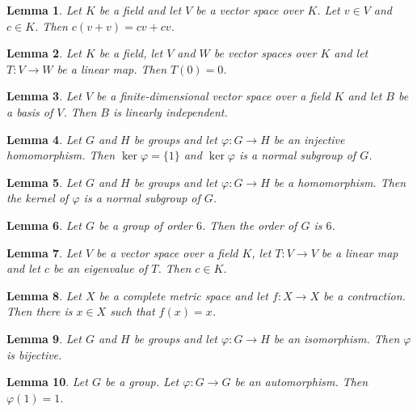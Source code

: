 \documentclass{article}
\newtheorem{lemma}{Lemma}
\begin{document}
\begin{lemma}\label{scalar}
Let $K$ be a field and let $V$ be a vector space over $K$. Let $v\in V$ and $c\in K$. Then $c(v+v)=cv+cv$.
\end{lemma}

\begin{lemma}\label{linear}
Let $K$ be a field, let $V$ and $W$ be vector spaces over $K$ and let $T\colon V\to W$ be a linear map. Then $T(0)=0$.
\end{lemma}

\begin{lemma}\label{basis}
Let $V$ be a finite-dimensional vector space over a field $K$ and let $B$ be a basis of $V$. Then $B$ is linearly independent.
\end{lemma}

\begin{lemma}\label{kernel}
Let $G$ and $H$ be groups and let $\varphi\colon G\to H$ be an injective homomorphism. Then $\ker\varphi=\{1\}$ and $\ker\varphi$ is a normal subgroup of $G$.
\end{lemma}

\begin{lemma}\label{kernel-normal}
Let $G$ and $H$ be groups and let $\varphi\colon G\to H$ be a homomorphism. Then the kernel of $\varphi$ is a normal subgroup of $G$.
\end{lemma}

\begin{lemma}\label{order}
Let $G$ be a group of order $6$. Then the order of $G$ is $6$.
\end{lemma}

\begin{lemma}\label{eigenvalue}
Let $V$ be a vector space over a field $K$, let $T\colon V\to V$ be a linear map and let $c$ be an eigenvalue of $T$. Then $c\in K$.
\end{lemma}

\begin{lemma}\label{contraction}
Let $X$ be a complete metric space and let $f\colon X\to X$ be a contraction. Then there is $x\in X$ such that $f(x)=x$.
\end{lemma}

\begin{lemma}\label{isomorphism}
Let $G$ and $H$ be groups and let $\varphi\colon G\to H$ be an isomorphism. Then $\varphi$ is bijective.
\end{lemma}

\begin{lemma}\label{automorphism}
Let $G$ be a group. Let $\varphi\colon G\to G$ be an automorphism. Then $\varphi(1)=1$.
\end{lemma}
\end{document}
